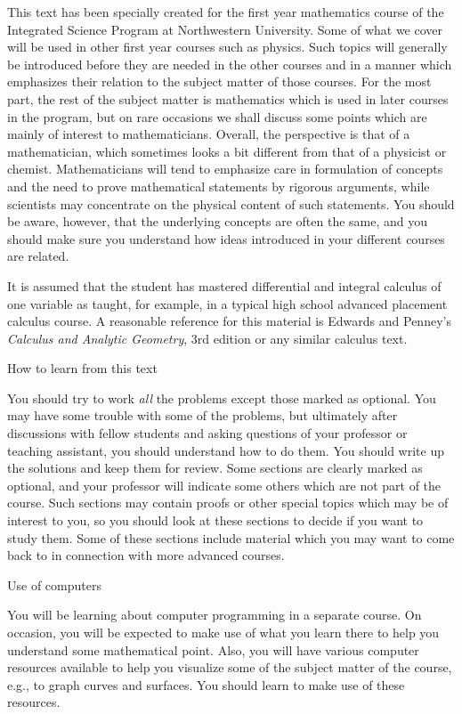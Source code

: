 This text has been specially created for the first year mathematics
course of the Integrated Science Program at Northwestern University.
Some of what we cover will be used in other first year
courses such as physics.   Such topics will generally be
introduced 
 before they are
needed in the other courses and in a manner which emphasizes
their relation to the subject matter of those courses.
 For the most part,
the rest of the subject matter
is mathematics  which is used in later courses in the program,
but on rare occasions we shall discuss some points which
are mainly of interest to mathematicians.   Overall,
the perspective is that of
 a mathematician, which sometimes looks a bit different from
that of a physicist or chemist.  Mathematicians will tend
to emphasize care in formulation of concepts and the need
to prove mathematical statements by rigorous arguments,
while scientists may concentrate on the physical content
of such statements.   You should be aware, however, that the
underlying concepts are often the same, and you should make sure
you understand how ideas introduced in your different courses
are related.   

It is assumed that the student has mastered differential and
integral calculus of one variable as taught, for example, in
a typical high school advanced placement calculus course.  A
reasonable reference for this material is
Edwards and Penney's {\it Calculus
and Analytic Geometry\/},  3rd edition or any similar calculus
text.

\medskip
\subhead How to learn from this text \endsubhead
\smallskip

You should try to work {\it all\/} the problems except those
marked as optional.  You may have some trouble with some of
the problems, but ultimately after discussions with fellow
students and asking questions of your professor or teaching
assistant, you should understand how to do them.  You should
write up the solutions and keep them for review.  Some sections
are clearly marked as optional, and your professor will indicate
some others which are not part of the course.  Such sections may
contain proofs or other special topics which may be of interest
to you, so you should look at these sections to decide if you
want to study them.  Some of these sections include material
which you may want to come back to in connection with more
advanced courses.


\medskip
\subhead Use of computers \endsubhead
\smallskip

You will be learning about computer programming in a separate
course.  On occasion, you will be expected to make use of
what you learn there to help you understand some mathematical
point.   Also, you will have various computer resources
available to help you visualize some of the subject matter
of the course, e.g., to graph curves and surfaces.  You
should learn to make use of these resources. 


